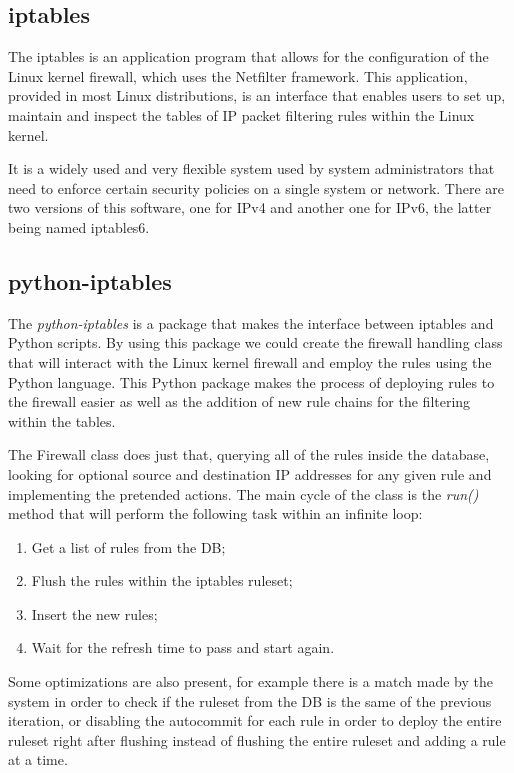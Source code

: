 \subsection{iptables}
\label{chap4:sec:firewall-sys:sub:iptables}
The iptables is an application program that allows for the configuration of the
Linux kernel firewall, which uses the Netfilter framework. This application,
provided in most Linux distributions, is an interface that enables users to
set up, maintain and inspect the tables of IP packet filtering rules within the
Linux kernel.

It is a widely used and very flexible system used by system administrators that
need to enforce certain security policies on a single system or network. There
are two versions of this software, one for IPv4 and another one for IPv6, the
latter being named iptables6.

\subsection{python-iptables}
\label{chap4:sec:firewall-sys:sub:iptc}
The \emph{python-iptables} is a package that makes the interface between
iptables and Python scripts. By using this package we could create the firewall
handling class that will interact with the Linux kernel firewall and employ the
rules using the Python language.
This Python package makes the process of deploying rules to the firewall easier
as well as the addition of new rule chains for the filtering within the tables.

The Firewall class does just that, querying all of the rules inside the
database, looking for optional source and destination IP addresses for any given
rule and implementing the pretended actions.
The main cycle of the class is the \emph{run()} method that will perform the
following task within an infinite loop:

\begin{enumerate}
	\item Get a list of rules from the DB;
	\item Flush the rules within the iptables ruleset;
	\item Insert the new rules;
	\item Wait for the refresh time to pass and start again.
\end{enumerate}

Some optimizations are also present, for example there is a match made by the
system in order to check if the ruleset from the DB is the same of the previous
iteration, or disabling the autocommit for each rule in order to deploy the
entire ruleset right after flushing instead of flushing the entire ruleset and
adding a rule at a time.

